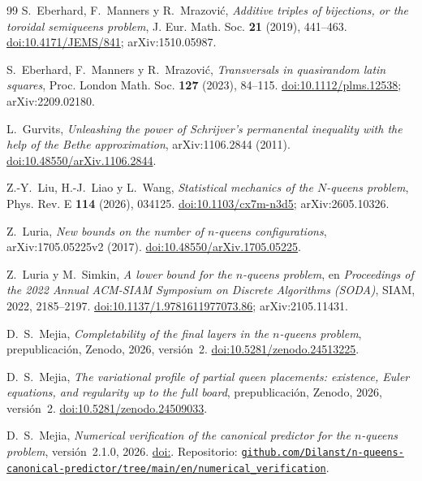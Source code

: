 \begin{thebibliography}{99}
 S.~Eberhard, F.~Manners y R.~Mrazović, \emph{Additive triples of bijections, or the
toroidal semiqueens problem}, J. Eur. Math. Soc. \textbf{21} (2019), 441--463.
\href{https://doi.org/10.4171/JEMS/841}{doi:10.4171/JEMS/841}; arXiv:1510.05987.

 S.~Eberhard, F.~Manners y R.~Mrazović, \emph{Transversals in quasirandom latin squares},
Proc. London Math. Soc. \textbf{127} (2023), 84--115.
\href{https://doi.org/10.1112/plms.12538}{doi:10.1112/plms.12538};
arXiv:2209.02180.

 L.~Gurvits, \emph{Unleashing the power of Schrijver's permanental inequality with
the help of the Bethe approximation}, arXiv:1106.2844 (2011).
\href{https://doi.org/10.48550/arXiv.1106.2844}{doi:10.48550/arXiv.1106.2844}.

 Z.-Y.~Liu, H.-J.~Liao y L.~Wang, \emph{Statistical mechanics of the $N$-queens problem},
Phys. Rev. E \textbf{114} (2026), 034125.
\href{https://doi.org/10.1103/cx7m-n3d5}{doi:10.1103/cx7m-n3d5}; arXiv:2605.10326.

 Z.~Luria, \emph{New bounds on the number of $n$-queens configurations},
arXiv:1705.05225v2 (2017).
\href{https://doi.org/10.48550/arXiv.1705.05225}{doi:10.48550/arXiv.1705.05225}.

 Z.~Luria y M.~Simkin, \emph{A lower bound for the $n$-queens problem}, en
\emph{Proceedings of the 2022 Annual ACM-SIAM Symposium on Discrete Algorithms (SODA)}, SIAM, 2022,
2185--2197.
\href{https://doi.org/10.1137/1.9781611977073.86}{doi:10.1137/1.9781611977073.86};
arXiv:2105.11431.

 D.~S.~Mejia, \emph{Completability of the final layers in the $n$-queens problem},
prepublicación, Zenodo, 2026, versión~2.
\href{https://doi.org/10.5281/zenodo.24513225}{doi:10.5281/zenodo.24513225}.

 D.~S.~Mejia, \emph{The variational profile of partial queen placements: existence,
Euler equations, and regularity up to the full board}, prepublicación, Zenodo, 2026, versión~2.
\href{https://doi.org/10.5281/zenodo.24509033}{doi:10.5281/zenodo.24509033}.

 D.~S.~Mejia, \emph{Numerical verification of the canonical predictor for the $n$-queens
problem}, versión~2.1.0, 2026.
\ifx\DOIcodigo\empty\else\href{https://doi.org/\DOIcodigo}{doi:\DOIcodigo}. \fi
Repositorio:
\href{https://github.com/Dilanst/n-queens-canonical-predictor/tree/main/en/numerical_verification}%
{\nolinkurl{github.com/Dilanst/n-queens-canonical-predictor/tree/main/en/numerical_verification}}.


\end{thebibliography}
